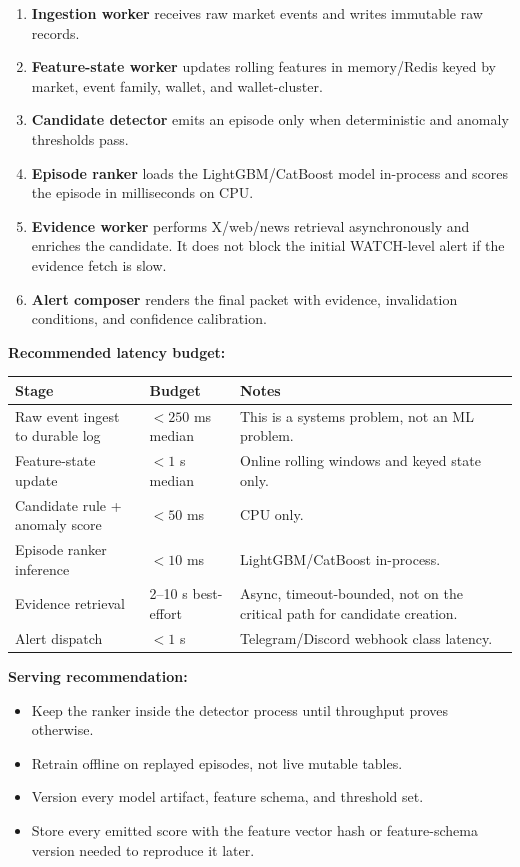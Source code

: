\documentclass[11pt,letterpaper]{article}
\begin{document}
\begin{enumerate}[nosep]
    \item \textbf{Ingestion worker} receives raw market events and writes immutable raw records.
    \item \textbf{Feature-state worker} updates rolling features in memory/Redis keyed by market, event family, wallet, and wallet-cluster.
    \item \textbf{Candidate detector} emits an episode only when deterministic and anomaly thresholds pass.
    \item \textbf{Episode ranker} loads the LightGBM/CatBoost model in-process and scores the episode in milliseconds on CPU.
    \item \textbf{Evidence worker} performs X/web/news retrieval asynchronously and enriches the candidate. It does not block the initial WATCH-level alert if the evidence fetch is slow.
    \item \textbf{Alert composer} renders the final packet with evidence, invalidation conditions, and confidence calibration.
\end{enumerate}

\textbf{Recommended latency budget:}

\begin{center}
\begin{tabular}{@{}p{4.8cm}p{3.2cm}p{6.0cm}@{}}
\toprule
\textbf{Stage} & \textbf{Budget} & \textbf{Notes} \\
\midrule
Raw event ingest to durable log & $< 250$ ms median & This is a systems problem, not an ML problem. \\
Feature-state update & $< 1$ s median & Online rolling windows and keyed state only. \\
Candidate rule + anomaly score & $< 50$ ms & CPU only. \\
Episode ranker inference & $< 10$ ms & LightGBM/CatBoost in-process. \\
Evidence retrieval & 2--10 s best-effort & Async, timeout-bounded, not on the critical path for candidate creation. \\
Alert dispatch & $< 1$ s & Telegram/Discord webhook class latency. \\
\bottomrule
\end{tabular}
\end{center}

\textbf{Serving recommendation:}
\begin{itemize}[nosep]
    \item Keep the ranker inside the detector process until throughput proves otherwise.
    \item Retrain offline on replayed episodes, not live mutable tables.
    \item Version every model artifact, feature schema, and threshold set.
    \item Store every emitted score with the feature vector hash or feature-schema version needed to reproduce it later.
\end{itemize}
\end{document}
